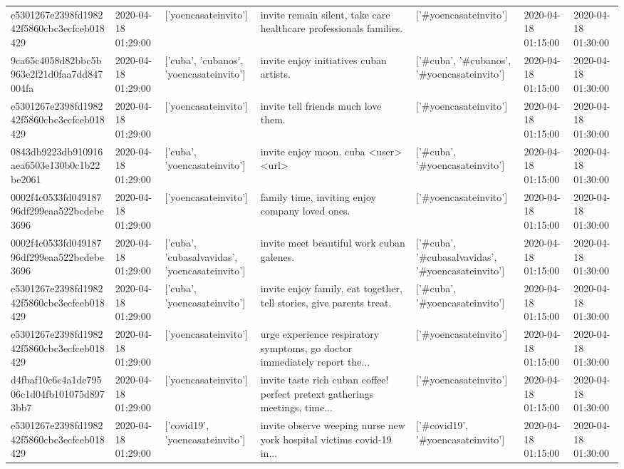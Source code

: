 \begin{tabular}{lllllll}
e5301267e2398fd198242f5860cbc3ecfceb018429 & 2020-04-18 01:29:00 & ['yoencasateinvito'] & invite remain silent, take care healthcare professionals families. & ['#yoencasateinvito'] & 2020-04-18 01:15:00 & 2020-04-18 01:30:00 \\
9ca65c4058d82bbc5b963e2f21d0faa7dd847004fa & 2020-04-18 01:29:00 & ['cuba', 'cubanos', 'yoencasateinvito'] & invite enjoy initiatives cuban artists. & ['#cuba', '#cubanos', '#yoencasateinvito'] & 2020-04-18 01:15:00 & 2020-04-18 01:30:00 \\
e5301267e2398fd198242f5860cbc3ecfceb018429 & 2020-04-18 01:29:00 & ['yoencasateinvito'] & invite tell friends much love them. & ['#yoencasateinvito'] & 2020-04-18 01:15:00 & 2020-04-18 01:30:00 \\
0843db9223db910916aea6503e130b0c1b22be2061 & 2020-04-18 01:29:00 & ['cuba', 'yoencasateinvito'] & invite enjoy moon. cuba <user> <url> & ['#cuba', '#yoencasateinvito'] & 2020-04-18 01:15:00 & 2020-04-18 01:30:00 \\
0002f4c0533fd04918796df299eaa522bcdebe3696 & 2020-04-18 01:29:00 & ['yoencasateinvito'] & family time, inviting enjoy company loved ones. & ['#yoencasateinvito'] & 2020-04-18 01:15:00 & 2020-04-18 01:30:00 \\
0002f4c0533fd04918796df299eaa522bcdebe3696 & 2020-04-18 01:29:00 & ['cuba', 'cubasalvavidas', 'yoencasateinvito'] & invite meet beautiful work cuban galenes. & ['#cuba', '#cubasalvavidas', '#yoencasateinvito'] & 2020-04-18 01:15:00 & 2020-04-18 01:30:00 \\
e5301267e2398fd198242f5860cbc3ecfceb018429 & 2020-04-18 01:29:00 & ['cuba', 'yoencasateinvito'] & invite enjoy family, eat together, tell stories, give parents treat. & ['#cuba', '#yoencasateinvito'] & 2020-04-18 01:15:00 & 2020-04-18 01:30:00 \\
e5301267e2398fd198242f5860cbc3ecfceb018429 & 2020-04-18 01:29:00 & ['yoencasateinvito'] & urge experience respiratory symptoms, go doctor immediately report the... & ['#yoencasateinvito'] & 2020-04-18 01:15:00 & 2020-04-18 01:30:00 \\
d4fbaf10c6c4a1de79506c1d04fb101075d8973bb7 & 2020-04-18 01:29:00 & ['yoencasateinvito'] & invite taste rich cuban coffee! perfect pretext gatherings meetings, time... & ['#yoencasateinvito'] & 2020-04-18 01:15:00 & 2020-04-18 01:30:00 \\
e5301267e2398fd198242f5860cbc3ecfceb018429 & 2020-04-18 01:29:00 & ['covid19', 'yoencasateinvito'] & invite observe weeping nurse new york hospital victims covid-19 in... & ['#covid19', '#yoencasateinvito'] & 2020-04-18 01:15:00 & 2020-04-18 01:30:00 \\

\end{tabular}

